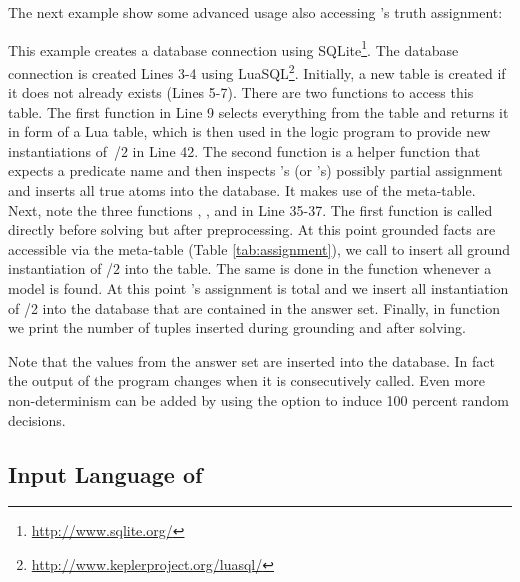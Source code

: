\begin{example}
The next example show some advanced usage also accessing \clasp's truth assignment:

This example creates a database connection using SQLite\footnote{\url{http://www.sqlite.org/}}.
The database connection is created Lines 3-4 using LuaSQL\footnote{\url{http://www.keplerproject.org/luasql/}}.
Initially, a new table  is created if it does not already exists (Lines 5-7).
There are two functions to access this table.
The first function  in Line 9 selects everything from the table and 
returns it in form of a Lua table, which is then used in the logic program
to provide new instantiations of~/$2$ in Line 42.
The second function  is a helper function that expects a predicate name
and then inspects \clingo's (or \iclingo's) possibly partial assignment and
inserts all true atoms into the database.
It makes use of the  meta-table.
Next, note the three functions
,
, and
in Line 35-37.
The first function is called directly before solving but after preprocessing.
At this point grounded facts are accessible via the  meta-table (Table \ref{tab:assignment}),
we call  to insert all ground instantiation of /$2$ into the  table.
The same is done in the  function whenever a model is found.
At this point \clingo's assignment is total and 
we insert all instantiation of /2 into the database that are contained in the answer set.
Finally, in function  we print the number of tuples inserted during grounding and after solving.

Note that the values from the answer set are inserted into the database.
In fact the output of the program changes when it is consecutively called.
Even more non-determinism can be added by using the option 
to induce 100 percent random decisions.
\eexample
\end{example}

\subsection{Input Language of \iclingo}\label{subsec:lang:iclingo}
%

